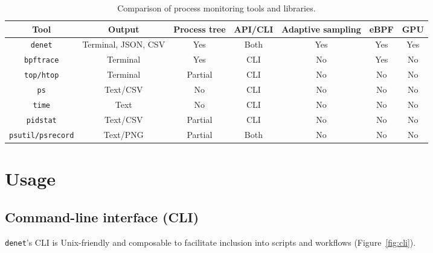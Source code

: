 \documentclass[10pt]{article}
\begin{document}
\begin{table}[ht]
  \centering
  \small
  \caption{Comparison of process monitoring tools and libraries.}
  \label{tab:tool_comparison}
  \begin{tabularx}{\linewidth}{c c c c c c c} %
   \toprule
    Tool                    & Output              & Process tree  & API/CLI & Adaptive sampling &  eBPF & GPU     \\
    \midrule
    \texttt{denet}          & Terminal, JSON, CSV & Yes          & Both    & Yes                   & Yes     & Yes \\
    \texttt{bpftrace}\cite{bpftrace}       & Terminal            & Yes         & CLI      & No                    & Yes & No \\
    \texttt{top/htop}       & Terminal            & Partial      & CLI     & No                    & No                & No \\
    \texttt{ps}             & Text/CSV            & No           & CLI     & No                    & No                & No\\
    \texttt{time}           & Text                & No           & CLI     & No                    & No                & No\\
    \texttt{pidstat}        & Text/CSV            & Partial      & CLI     & No           & No        & No        \\
    \texttt{psutil\cite{rodola2020psutil}/psrecord\cite{psrecord}}& Text/PNG  & Partial      & Both     & No          & No     & No       \\
    \bottomrule
  \end{tabularx}
\end{table}

\vspace{-0.8cm}

\section*{Usage}

\subsection*{Command-line interface (CLI)}

\texttt{denet}'s CLI is Unix-friendly \cite{raymond1999cathedral} and composable to facilitate inclusion into scripts and workflows (Figure~\ref{fig:cli}).\\
\end{document}
